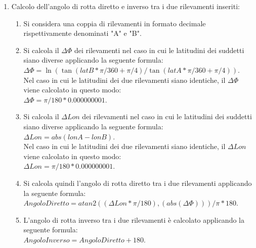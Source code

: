 \documentclass{article}
\begin{document}
\begin{enumerate}
	\item  Calcolo dell'angolo di rotta diretto e inverso tra i due rilevamenti inseriti:
	\begin{enumerate}
		\item  Si considera una coppia di rilevamenti in formato decimale rispettivamente denominati "A" e "B".
		\item Si calcola il $\Delta\Phi$ dei rilevamenti nel caso in cui le latitudini dei suddetti siano diverse applicando la seguente formula:\\ $\Delta\Phi = \ln( \tan(latB * \pi / 360 + \pi / 4 ) / \tan(latA * \pi / 360 + \pi / 4 )). $\\
		Nel caso in cui le latitudini dei due rilevamenti siano identiche, il $\Delta\Phi$ viene calcolato in questo modo:\\ $\Delta\Phi = \pi / 180 * 0.000000001.$
		\item Si calcola il $\Delta Lon$ dei rilevamenti nel caso in cui le latitudini dei suddetti siano diverse applicando la seguente formula:\\ $ \Delta Lon = abs(lonA - lonB). $\\
		Nel caso in cui le latitudini dei due rilevamenti siano identiche, il $\Delta Lon$ viene calcolato in questo modo:\\ $\Delta Lon = \pi / 180 * 0.000000001.$
		\item Si calcola quindi l'angolo di rotta diretto tra i due rilevamenti applicando la seguente formula:\\ $ Angolo Diretto = atan2((\Delta Lon * \pi / 180), (abs(\Delta\Phi))) / \pi * 180.$\\
		\item L'angolo di rotta inverso tra i due rilevamenti è calcolato applicando la seguente formula: \\ $ Angolo Inverso = Angolo Diretto+ 180.$\\
	\end{enumerate}

\end{enumerate}
\newpage
\end{document}
